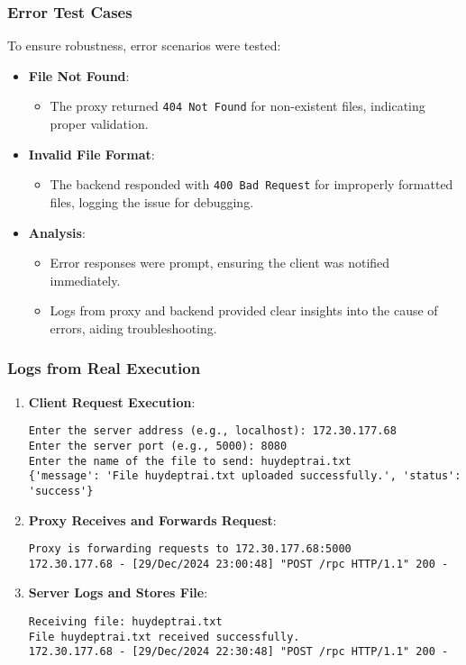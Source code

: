 \documentclass{article}
\begin{document}
\subsubsection*{Error Test Cases}
To ensure robustness, error scenarios were tested:
\begin{itemize}
\item \textbf{File Not Found}:
\begin{itemize}
\item The proxy returned \texttt{404 Not Found} for non-existent files, indicating proper validation.
\end{itemize}
\item \textbf{Invalid File Format}:
\begin{itemize}
\item The backend responded with \texttt{400 Bad Request} for improperly formatted files, logging the issue for debugging.
\end{itemize}
\item \textbf{Analysis}:
\begin{itemize}
\item Error responses were prompt, ensuring the client was notified immediately.
\item Logs from proxy and backend provided clear insights into the cause of errors, aiding troubleshooting.
\end{itemize}
\end{itemize}

\subsubsection*{Logs from Real Execution}
\begin{enumerate}
\item \textbf{Client Request Execution}:
\begin{lstlisting}
Enter the server address (e.g., localhost): 172.30.177.68
Enter the server port (e.g., 5000): 8080
Enter the name of the file to send: huydeptrai.txt
{'message': 'File huydeptrai.txt uploaded successfully.', 'status': 'success'}
\end{lstlisting}

\item \textbf{Proxy Receives and Forwards Request}:
\begin{lstlisting}
Proxy is forwarding requests to 172.30.177.68:5000
172.30.177.68 - [29/Dec/2024 23:00:48] "POST /rpc HTTP/1.1" 200 -
\end{lstlisting}

\item \textbf{Server Logs and Stores File}:
\begin{lstlisting}
Receiving file: huydeptrai.txt
File huydeptrai.txt received successfully.
172.30.177.68 - [29/Dec/2024 22:30:48] "POST /rpc HTTP/1.1" 200 -
\end{lstlisting}
\end{enumerate}
\end{document}
